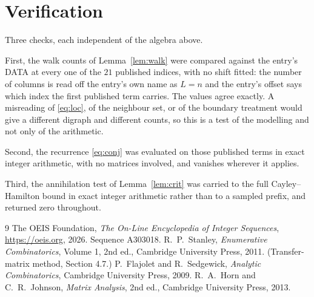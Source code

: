 \documentclass[11pt,a4paper]{article}
\theoremstyle{plain}
\theoremstyle{definition}
\begin{document}
\section{Verification}

Three checks, each independent of the algebra above.

First, the walk counts of Lemma~\ref{lem:walk} were compared against the entry's DATA at
every one of the $21$ published indices, with no shift fitted: the number of columns is
read off the entry's own name as $L=n$ and the entry's offset says which index the first
published term carries. The values agree exactly. A misreading of \eqref{eq:loc}, of the
neighbour set, or of the boundary treatment would give a different digraph and different
counts, so this is a test of the modelling and not only of the arithmetic.

Second, the recurrence \eqref{eq:conj} was evaluated on those published terms in exact
integer arithmetic, with no matrices involved, and vanishes wherever it applies.

Third, the annihilation test of Lemma~\ref{lem:crit} was carried to the full
Cayley--Hamilton bound in exact integer arithmetic rather than to a sampled prefix, and
returned zero throughout.

\begin{thebibliography}{9}
 The OEIS Foundation, \emph{The On-Line Encyclopedia of Integer
Sequences}, \url{https://oeis.org}, 2026. Sequence A303018.
 R.~P.~Stanley, \emph{Enumerative Combinatorics}, Volume 1, 2nd ed.,
Cambridge University Press, 2011. (Transfer-matrix method, Section 4.7.)
 P.~Flajolet and R.~Sedgewick, \emph{Analytic Combinatorics}, Cambridge
University Press, 2009.
 R.~A.~Horn and C.~R.~Johnson, \emph{Matrix Analysis}, 2nd ed., Cambridge
University Press, 2013.
\end{thebibliography}
\end{document}
